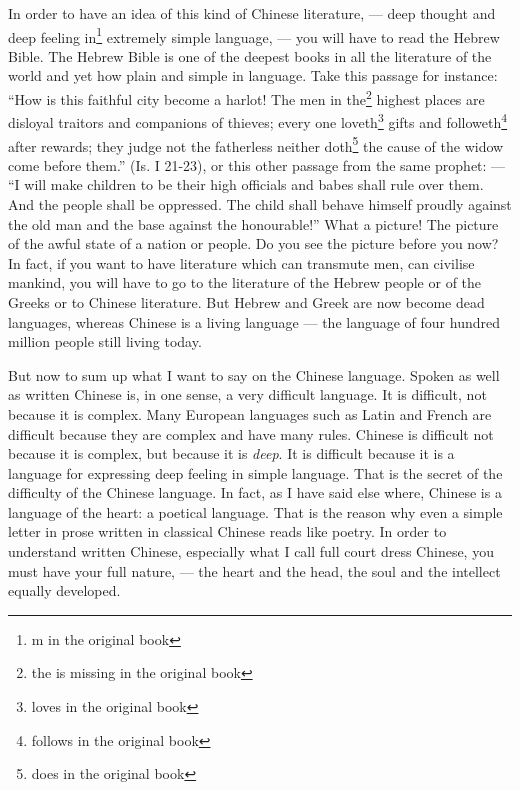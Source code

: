In order to have an idea of this kind of Chinese literature, --- deep thought and deep feeling in\footnote{m in the original book} extremely simple language, --- you will have to read the Hebrew Bible. 
The Hebrew Bible is one of the deepest books in all the literature of the world and yet how plain and simple in language.
Take this passage for instance: ``How is this faithful city become a harlot!
The men in the\footnote{the is missing in the original book} highest places are disloyal traitors and companions of thieves;
every one loveth\footnote{loves in the original book} gifts and followeth\footnote{follows in the original book} after rewards;
they judge not the fatherless neither doth\footnote{does in the original book} the cause of the widow come before them.'' 
(Is. I 21-23), or this other passage from the same prophet: --- ``I will make children to be their high officials and babes shall rule over them. And the people shall be oppressed. The child shall behave himself proudly against the old man and the base against the honourable!''
What a picture! The picture of the awful state of a nation or people.
Do you see the picture before you now?
In fact, if you want to have literature which can transmute men, can civilise mankind, you will have to go to the literature of the Hebrew people or of the Greeks or to Chinese literature.
But Hebrew and Greek are now become dead languages, whereas Chinese is a living language --- the language of four hundred million people still living today.

But now to sum up what I want to say on the Chinese language.
Spoken as well as written Chinese is, in one sense, a very difficult language.
It is difficult, not because it is complex.
Many European languages such as Latin and French are difficult because they are complex and have many rules.
Chinese is difficult not because it is complex, but because it is \emph{deep}.
It is difficult because it is a language for expressing deep feeling in simple language.
That is the secret of the difficulty of the Chinese language.
In fact, as I have said else where, Chinese is a language of the heart: a poetical language.
That is the reason why even a simple letter in prose written in classical Chinese reads like poetry.
In order to understand written Chinese, especially what I call full court dress Chinese, you must have your full nature, --- the heart and the head, the soul and the intellect equally developed.

